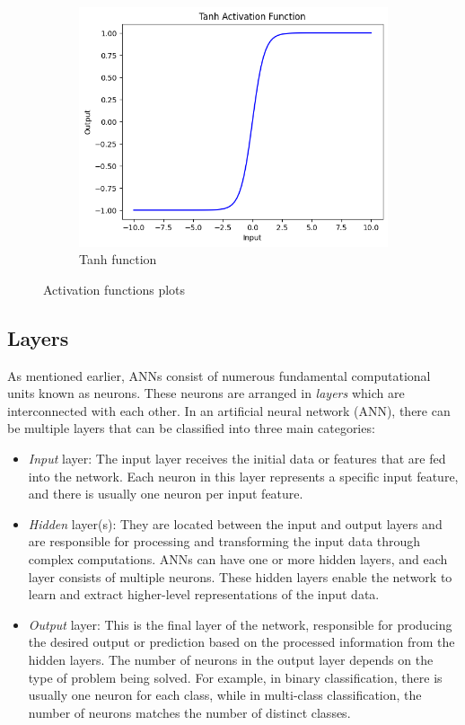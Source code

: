 \begin{figure}[h]
\begin{subfigure}{.33\textwidth}
		\includegraphics[width=0.9\linewidth]{ImageFiles/NeuralNetworks/tanh}
		\caption{Tanh function}
		\label{fig:tanh}
	\end{subfigure}
	\caption{Activation functions plots}
\end{figure}

\subsection{Layers}

As mentioned earlier, ANNs consist of numerous fundamental computational units known as neurons. These neurons are arranged in \textit{layers} which are interconnected with each other. In an artificial neural network (ANN), there can be multiple layers that can be classified into three main categories:

\begin{itemize}
	\item \textit{Input} layer: The input layer receives the initial data or features that are fed into the network. Each neuron in this layer represents a specific input feature, and there is usually one neuron per input feature.
	
	\item \textit{Hidden} layer(s): They are located between the input and output layers and are responsible for processing and transforming the input data through complex computations. ANNs can have one or more hidden layers, and each layer consists of multiple neurons. These hidden layers enable the network to learn and extract higher-level representations of the input data.
	
	\item \textit{Output} layer: This is the final layer of the network, responsible for producing the desired output or prediction based on the processed information from the hidden layers. The number of neurons in the output layer depends on the type of problem being solved. For example, in binary classification, there is usually one neuron for each class, while in multi-class classification, the number of neurons matches the number of distinct classes.
\end{itemize}

